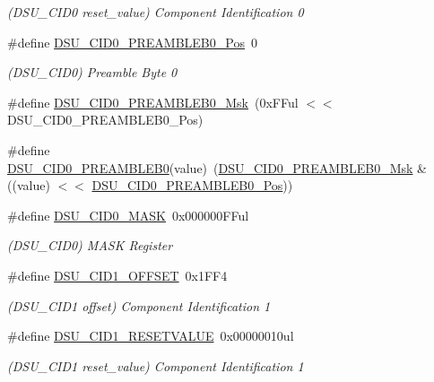 \begin{DoxyCompactItemize}
\begin{DoxyCompactList}\small\item\em (D\+S\+U\+\_\+\+C\+I\+D0 reset\+\_\+value) Component Identification 0 \end{DoxyCompactList}\item 
\#define \mbox{\hyperlink{group___s_a_m_d21___d_s_u_ga684c02c36c7acb7066c55e248c85c44e}{D\+S\+U\+\_\+\+C\+I\+D0\+\_\+\+P\+R\+E\+A\+M\+B\+L\+E\+B0\+\_\+\+Pos}}~0
\begin{DoxyCompactList}\small\item\em (D\+S\+U\+\_\+\+C\+I\+D0) Preamble Byte 0 \end{DoxyCompactList}\item 
\#define \mbox{\hyperlink{group___s_a_m_d21___d_s_u_gaccaacf599c31ea471efbdf7838d26de6}{D\+S\+U\+\_\+\+C\+I\+D0\+\_\+\+P\+R\+E\+A\+M\+B\+L\+E\+B0\+\_\+\+Msk}}~(0x\+F\+Ful $<$$<$ D\+S\+U\+\_\+\+C\+I\+D0\+\_\+\+P\+R\+E\+A\+M\+B\+L\+E\+B0\+\_\+\+Pos)
\item 
\#define \mbox{\hyperlink{group___s_a_m_d21___d_s_u_ga38870d39881d4e6cbacc18de7a44529c}{D\+S\+U\+\_\+\+C\+I\+D0\+\_\+\+P\+R\+E\+A\+M\+B\+L\+E\+B0}}(value)~(\mbox{\hyperlink{group___s_a_m_d21___d_s_u_gaccaacf599c31ea471efbdf7838d26de6}{D\+S\+U\+\_\+\+C\+I\+D0\+\_\+\+P\+R\+E\+A\+M\+B\+L\+E\+B0\+\_\+\+Msk}} \& ((value) $<$$<$ \mbox{\hyperlink{group___s_a_m_d21___d_s_u_ga684c02c36c7acb7066c55e248c85c44e}{D\+S\+U\+\_\+\+C\+I\+D0\+\_\+\+P\+R\+E\+A\+M\+B\+L\+E\+B0\+\_\+\+Pos}}))
\item 
\#define \mbox{\hyperlink{group___s_a_m_d21___d_s_u_ga7c41f1841c69429dc59c6466b4fc0742}{D\+S\+U\+\_\+\+C\+I\+D0\+\_\+\+M\+A\+SK}}~0x000000\+F\+Ful
\begin{DoxyCompactList}\small\item\em (D\+S\+U\+\_\+\+C\+I\+D0) M\+A\+SK Register \end{DoxyCompactList}\item 
\#define \mbox{\hyperlink{group___s_a_m_d21___d_s_u_ga1000fee5818fa48da89833ca079a3a5c}{D\+S\+U\+\_\+\+C\+I\+D1\+\_\+\+O\+F\+F\+S\+ET}}~0x1\+F\+F4
\begin{DoxyCompactList}\small\item\em (D\+S\+U\+\_\+\+C\+I\+D1 offset) Component Identification 1 \end{DoxyCompactList}\item 
\#define \mbox{\hyperlink{group___s_a_m_d21___d_s_u_ga0ddd2062d17bc1957afe23b2f02a46bd}{D\+S\+U\+\_\+\+C\+I\+D1\+\_\+\+R\+E\+S\+E\+T\+V\+A\+L\+UE}}~0x00000010ul
\begin{DoxyCompactList}\small\item\em (D\+S\+U\+\_\+\+C\+I\+D1 reset\+\_\+value) Component Identification 1 \end{DoxyCompactList}\item 

\end{DoxyCompactItemize}
